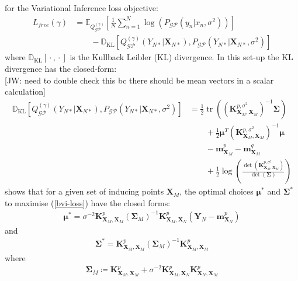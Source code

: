 \documentclass{article}
\newcommand{\jw}[1]{{\color{gray} [JW: #1]}}
\newcommand{\KLD}{\operatorname{\mathbb{D}_{KL}}}
\newcommand{\tr}{\operatorname{tr}}
\newcommand{\GP}{\operatorname{\mathcal{GP}}}
\newcommand{\wc}{\operatorname{{}\cdot{}}}
\numberwithin{equation}{section}
\begin{document}
for the Variational Inference loss objective:
\begin{align}
    \label{bvi-loss}
    L_{free}(\gamma) &=\mathbb{E}_{Q^{(\gamma)}_{\GP}}\left[\frac{1}{N}\sum_{n=1}^N\log \left(P_{\GP}\left(y_n \vert x_n, \sigma^2\right)\right)\right] \nonumber \\
    & \qquad - \KLD \left[Q^{(\gamma)}_{\GP}\left(Y_{N*} \vert \mathbf{X}_{N*}\right), P_{\GP}\left( Y_{N*} \vert \mathbf{X}_{N*}, \sigma^2\right) \right]
    \label{bvi-loss}
\end{align}
where $\KLD[\wc, \wc]$ is the Kullback Leibler (KL) divergence. In this set-up the KL divergence has the closed-form:
\\\jw{need to double check this bc there should be mean vectors in a scalar calculation}
\begin{align}
    \KLD \left[Q^{(\gamma)}_{\GP}\left(Y_{N*} \vert \mathbf{X}_{N*}\right), P_{\GP}\left( Y_{N*} \vert \mathbf{X}_{N*}, \sigma^2\right) \right] &= \frac{1}{2} \tr\left(\left(\mathbf{K}^{p, \sigma^2}_{\mathbf{X}_M, \mathbf{X}_M}\right)^{-1} \boldsymbol{\Sigma}\right)  \nonumber \\
    & \qquad  + \frac{1}{2}\boldsymbol{\mu}^T \left(\mathbf{K}^{p, \sigma^2}_{\mathbf{X}_M, \mathbf{X}_M}\right)^{-1} \boldsymbol{\mu}  \nonumber \\
    & \qquad -  \mathbf{m}^p_{\mathbf{X}_M} \nonumber - \mathbf{m}^q_{\mathbf{X}_M} \nonumber \\
    & \qquad + \frac{1}{2} \log\left(\frac{\det\left(\mathbf{K}^{p, \sigma^2}_{\mathbf{X}_M, \mathbf{X}_M}\right)}{\det\left(\boldsymbol{\Sigma}\right)}\right)
    \label{kld-closed-form}
\end{align}
\cite{titsias2009variational} shows that for a given set of inducing points $\mathbf{X}_M$, the optimal choices $\boldsymbol{\mu}^*$ and $\mathbf{\Sigma}^*$ to maximise (\ref{bvi-loss}) have the closed forms:
\begin{align}
    \label{svgp-optimal-mean}
    \boldsymbol{\mu}^* = \sigma^{-2}\mathbf{K}^p_{\mathbf{X}_M, \mathbf{X}_M}  \left(\mathbf{\Sigma}_M\right)^{-1}\mathbf{K}^p_{\mathbf{X}_M, \mathbf{X}_N}  \left(\mathbf{Y}_N - \mathbf{m}^p_{\mathbf{X}_N}\right)
\end{align}
and
\begin{align}
    \label{svgp-optimal-covariance}
    \mathbf{\Sigma}^* = \mathbf{K}^p_{\mathbf{X}_M, \mathbf{X}_M}  \left(\mathbf{\Sigma}_M\right)^{-1}\mathbf{K}^p_{\mathbf{X}_M, \mathbf{X}_M} 
\end{align}
where 
\begin{align}
    \mathbf{\Sigma}_M \coloneqq \mathbf{K}^p_{\mathbf{X}_M, \mathbf{X}_M}  + \sigma^{-2}\mathbf{K}^p_{\mathbf{X}_M, \mathbf{X}_N} \mathbf{K}^p_{\mathbf{X}_N, \mathbf{X}_M} 
    \label{svgp-optimal-sigma-m}
\end{align}
\end{document}
